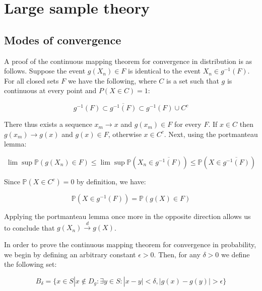 \documentclass{report}
\begin{document}
\section{Large sample theory}\label{sec:examples-lst}

\subsection{Modes of convergence}

A proof of the continuous mapping theorem for convergence in distribution is as follows. Suppose the event $g(X_n) \in F$ is identical to the event $X_n \in g^{-1}(F)$. For all closed sets $F$ we have the following, where $C$ is a set such that $g$ is continuous at every point and $P(X \in C) = 1$:

\begin{equation}\label{eq:ex-lst-cmt-dist-proof-1}
    g^{-1}(F) \subset \overline{g^{-1}(F)} \subset g^{-1}(F) \cup C^c
\end{equation}

There thus exists a sequence $x_m \to x$ and $g(x_m) \in F$ for every $F$. If $x \in C$ then $g(x_m) \to g(x)$ and $g(x) \in F$, otherwise $x \in C^c$. Next, using the portmanteau lemma:

\begin{equation}\label{eq:ex-lst-cmt-dist-proof-2}
    \lim \sup \mathbb{P}(g(X_n) \in F) \le \lim \sup \mathbb{P}\left(X_n \in \overline{g^{-1}(F)}\right) \le \mathbb{P}\left(X \in \overline{g^{-1}(F)}\right)
\end{equation}

Since $\mathbb{P}(X \in C^c) = 0$ by definition, we have:

\begin{equation}\label{eq:ex-lst-cmt-dist-proof-3}
    \mathbb{P}(X \in g^{-1}(F)) = \mathbb{P}(g(X) \in F)
\end{equation}

Applying the portmanteau lemma once more in the opposite direction allows us to conclude that $g(X_n) \overset{d}{\to} g(X)$. 

In order to prove the continuous mapping theorem for convergence in probability, we begin by defining an arbitrary constant $\epsilon > 0$. Then, for any $\delta > 0$ we define the following set:

\begin{equation}\label{eq:ex-lst-cmt-prob-proof-1}
    B_\delta = \{x \in S | x \notin D_g : \exists y \in S : |x - y| < \delta, |g(x) - g(y)| > \epsilon \} 
\end{equation}
\end{document}
